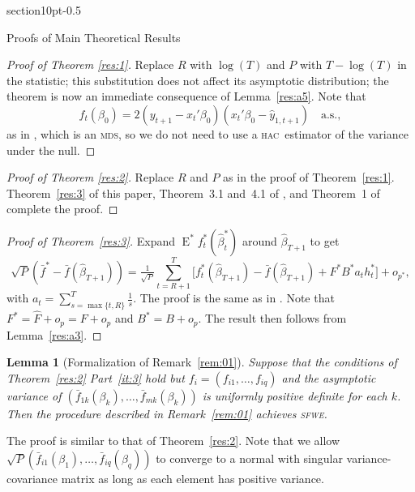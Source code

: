 \documentclass[10pt,fleqn,draft]{article}
\makeatletter
\renewcommand\section{\@startsection%
{section}{1}{0pt}{-\baselineskip}{0.5\baselineskip}%
{\normalfont\normalsize\bfseries\large\raggedright}}
\newtheorem{lem}[thm]{Lemma}
\theoremstyle{definition}
\DeclareMathOperator{\E}{E}
\newcommand{\hac}{\textsc{hac}}
\newcommand{\mds}{\textsc{mds}}
\newcommand{\sfwe}{\textsc{sfwe}}
\makeatother
\begin{document}
\section{Proofs of Main Theoretical Results}\label{sec:B}

\begin{proof}[Proof of Theorem \ref{res:1}]
  Replace $R$ with $\log(T)$ and $P$ with $T - \log(T)$ in the
  statistic; this substitution does not affect its asymptotic
  distribution; the theorem is now an immediate consequence of
  Lemma~\ref{res:a5}.  Note that \[f_t(\beta_0)= 2 (y_{t+1} -
  x_t'\beta_0)(x_t'\beta_0 - \hat{y}_{1,t+1}) \quad \text{a.s.},\] as
  in \citet{ClW:07}, which is an \mds, so we do not need to use a
  \hac\ estimator of the variance under the null.
\end{proof}

\begin{proof}[Proof of Theorem \ref{res:2}]
  Replace $R$ and $P$ as in the proof of Theorem~\ref{res:1}.
  Theorem~\ref{res:3} of this paper, Theorem~3.1 and~4.1 of
  \citet{RoW:05}, and Theorem~1 of \citet{Cal:11e} complete the proof.
\end{proof}

\begin{proof}[Proof of Theorem~\ref{res:3}] Expand $\E^{*}
  f_t^{*}(\hat{\beta}_t^{*})$ around $\hat{\beta}_{T+1}$ to get
  \begin{equation}
    \sqrt{P} (\bar{f}^{*} - \bar{f}(\hat{\beta}_{T+1})) =
    \tfrac{1}{\sqrt{P}} \sum_{t=R+1}^T
    \big[f_t^{*}(\hat{\beta}_{T+1}) - \bar{f}(\hat{\beta}_{T+1}) +
    F^{*} B^{*} a_t h_t^{*} \big] + o_{p^{*}},
  \end{equation}
  with $a_t = \sum_{s=\max\{t,R\}}^T \tfrac1s$.  The proof is the same as
  in \citet[Theorem 2.3.1]{Mcc:00}.  Note that $F^{*} = \hat{F} +
  o_{p} = F + o_p$ and $B^{*} = B + o_{p}$.  The result then follows
  from Lemma~\ref{res:a3}.
\end{proof}

\begin{lem}[Formalization of Remark~\ref{rem:01}]
  Suppose that the conditions of Theorem~\ref{res:2} Part~\ref{it:3}
  hold but $f_i = (f_{i1},\dots,f_{iq})$ and the asymptotic variance
  of $(\bar{f}_{1k}(\beta_k),\dots,\bar{f}_{mk}(\beta_k))$ is
  uniformly positive definite for each $k$.  Then the procedure
  described in Remark~\ref{rem:01} achieves \sfwe.
\end{lem}

The proof is similar to that of Theorem~\ref{res:2}. Note that we
allow $\sqrt{P}(\bar{f}_{i1}(\beta_1),\dots,\bar{f}_{iq}(\beta_q))$ to
converge to a normal with singular variance-covariance matrix as long
as each element has positive variance.


\end{document}
